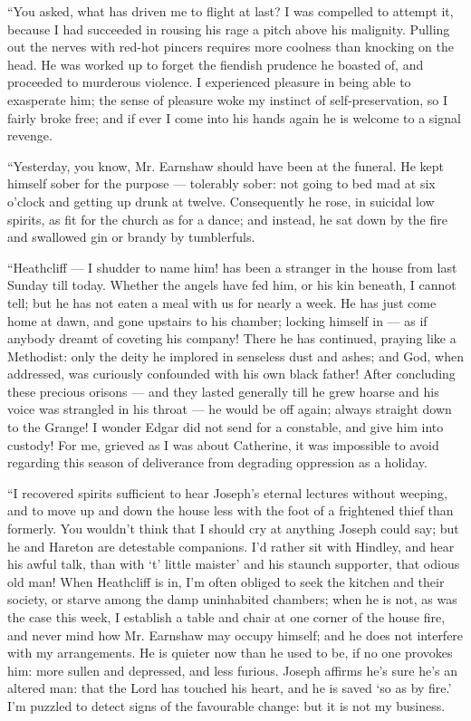 \par “You asked, what has driven me to flight at last? I was compelled to attempt it, because I had succeeded in rousing his rage a pitch above his malignity. Pulling out the nerves with red-hot pincers requires more coolness than knocking on the head. He was worked up to forget the fiendish prudence he boasted of, and proceeded to murderous violence. I experienced pleasure in being able to exasperate him; the sense of pleasure woke my instinct of self-preservation, so I fairly broke free; and if ever I come into his hands again he is welcome to a signal revenge.
\par “Yesterday, you know, Mr. Earnshaw should have been at the funeral. He kept himself sober for the purpose — tolerably sober: not going to bed mad at six o'clock and getting up drunk at twelve. Consequently he rose, in suicidal low spirits, as fit for the church as for a dance; and instead, he sat down by the fire and swallowed gin or brandy by tumblerfuls.
\par “Heathcliff — I shudder to name him! has been a stranger in the house from last Sunday till today. Whether the angels have fed him, or his kin beneath, I cannot tell; but he has not eaten a meal with us for nearly a week. He has just come home at dawn, and gone upstairs to his chamber; locking himself in — as if anybody dreamt of coveting his company! There he has continued, praying like a Methodist: only the deity he implored in senseless dust and ashes; and God, when addressed, was curiously confounded with his own black father! After concluding these precious orisons — and they lasted generally till he grew hoarse and his voice was strangled in his throat — he would be off again; always straight down to the Grange! I wonder Edgar did not send for a constable, and give him into custody! For me, grieved as I was about Catherine, it was impossible to avoid regarding this season of deliverance from degrading oppression as a holiday.
\par “I recovered spirits sufficient to hear Joseph's eternal lectures without weeping, and to move up and down the house less with the foot of a frightened thief than formerly. You wouldn't think that I should cry at anything Joseph could say; but he and Hareton are detestable companions. I'd rather sit with Hindley, and hear his awful talk, than with ‘t' little maister' and his staunch supporter, that odious old man! When Heathcliff is in, I'm often obliged to seek the kitchen and their society, or starve among the damp uninhabited chambers; when he is not, as was the case this week, I establish a table and chair at one corner of the house fire, and never mind how Mr. Earnshaw may occupy himself; and he does not interfere with my arrangements. He is quieter now than he used to be, if no one provokes him: more sullen and depressed, and less furious. Joseph affirms he's sure he's an altered man: that the Lord has touched his heart, and he is saved ‘so as by fire.' I'm puzzled to detect signs of the favourable change: but it is not my business.
